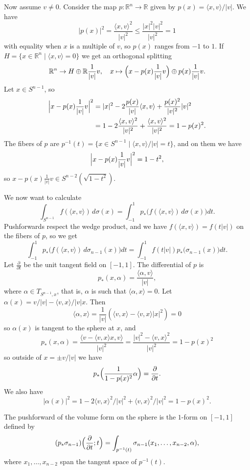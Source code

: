 \documentclass[11pt]{article}
\theoremstyle{definition}
\newcommand{\kk}[1]{\mathbb{#1}}
\begin{document}
Now assume $v \not= 0$. Consider the map $p : \kk R^n \to \kk R$ given by $p(x) = \langle x, v \rangle / |v|$.
We have
\[
|p(x)|^2
= \frac{\langle x, v \rangle^2}{|v|^2}
\leq \frac{|x|^2 |v|^2}{|v|^2} = 1
\]
with equality when $x$ is a multiple of $v$, so $p(x)$ ranges from $-1$ to $1$.
If $H = \{ x \in \kk R^n \mid \langle x, v \rangle = 0\}$
we get an orthogonal splitting
\[
\kk R^n \to H \oplus \kk R \frac{1}{|v|}v,
\quad
x \mapsto \Bigl(x - p(x) \frac{1}{|v|} v\Bigr) \oplus p(x) \frac{1}{|v|}v.
\]
Let $x \in S^{n-1}$, so
\begin{align*}
\Bigl|x - p(x)\frac{1}{|v|}v\Bigr|^2
&= |x|^2 - 2 \frac{p(x)}{|v|} \langle x, v \rangle + \frac{p(x)^2}{|v|^2} |v|^2
\\
&= 1 - 2 \frac{\langle x, v \rangle^2}{|v|^2} + \frac{\langle x, v \rangle^2}{|v|^2}
= 1 - p(x)^2.
\end{align*}
The fibers of $p$ are $p^{-1}(t) = \{ x \in S^{n-1} \mid \langle x, v \rangle/|v| = t \}$, and on them we have
\[
\Bigl|x-p(x)\frac{1}{|v|}v\Bigr|^2
= 1 - t^2,
\]
so $x-p(x)\frac{1}{|v|}v \in S^{n-2}(\sqrt{1-t^2})$.

We now want to calculate
\[
\int_{S^{n-1}} f(\langle x, v \rangle) \, d\sigma(x)
= \int_{-1}^{1} p_*\bigl(f(\langle x, v \rangle) \, d\sigma(x)\bigr) dt.
\]
Pushforwards respect the wedge product, and we have $f(\langle x, v \rangle) = f(t|v|)$ on the fibers of $p$, so we get
\[
\int_{-1}^{1} p_*\bigl(f(\langle x, v \rangle) \, d\sigma_{n-1}(x)\bigr) dt
= \int_{-1}^{1} f(t|v|) p_*\bigl(\sigma_{n-1}(x)\bigr) dt.
\]
Let $\frac{\partial}{\partial t}$ be the unit tangent field on $[-1,1]$. The differential of $p$ is
\[
p_*(x, \alpha) = \frac{\langle \alpha, v \rangle}{|v|},
\]
where $\alpha \in T_{S^{n-1},x}$, that is, $\alpha$ is such that $\langle \alpha, x \rangle = 0$. Let $\alpha(x) = v/|v| - \langle v, x \rangle/|v| x$. Then
\[
\langle \alpha, x \rangle
= \frac{1}{|v|}(\langle v, x \rangle - \langle v, x \rangle |x|^2) = 0
\]
so $\alpha(x)$ is tangent to the sphere at $x$,
and
\[
p_*(x, \alpha)
= \frac{\langle v - \langle v, x \rangle x, v \rangle}{|v|^2}
= \frac{|v|^2 - \langle v, x \rangle^2}{|v|^2}
= 1 - p(x)^2
\]
so outside of $x = \pm v/|v|$ we have
\[
p_* \Bigl( \frac{1}{1-p(x)^2} \alpha \Bigr) = \frac{\partial}{\partial t}.
\]
We also have
\[
|\alpha(x)|^2
= 1 - 2 \langle v, x \rangle^2 / |v|^2 + \langle v, x \rangle^2 / |v|^2
= 1 - p(x)^2.
\]

The pushforward of the volume form on the sphere is the $1$-form on $[-1,1]$ defined by
\[
(p_* \sigma_{n-1})\Bigl( \frac{\partial}{\partial t}; t \Bigr)
= \int_{p^{-1}(t)} \sigma_{n-1}(x_1, \ldots, x_{n-2}, \alpha),
\]
where $x_1,\ldots,x_{n-2}$ span the tangent space of $p^{-1}(t)$.
\end{document}
